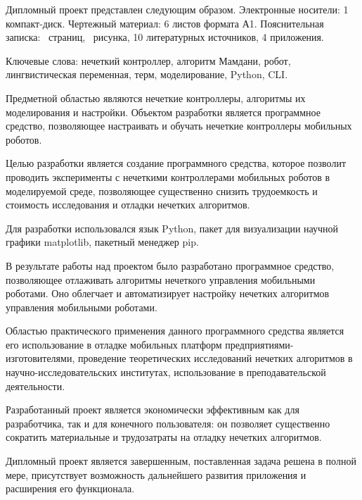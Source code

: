 \thispagestyle{empty}

Дипломный проект представлен следующим образом. Электронные
носители: 1 компакт-диск. Чертежный материал: 6 листов формата А1.
Пояснительная записка: \pageref*{LastPage}~страниц, \totfig{}~рисунка, 10 литературных
источников, 4 приложения.

Ключевые слова: нечеткий контроллер, алгоритм Мамдани, робот,
лингвистическая переменная, терм, моделирование, Python, CLI.

Предметной областью являются нечеткие контроллеры, алгоритмы их
моделирования и настройки. Объектом разработки является программное
средство, позволяющее настраивать и обучать нечеткие контроллеры
мобильных роботов.

Целью разработки является создание программного средства, которое
позволит проводить эксперименты с нечеткими контроллерами мобильных
роботов в моделируемой среде, позволяющее существенно снизить
трудоемкость и стоимость исследования и отладки нечетких алгоритмов.

Для разработки использовался язык Python, пакет для визуализации
научной графики matplotlib, пакетный менеджер pip.

В результате работы над проектом было разработано программное
средство, позволяющее отлаживать алгоритмы нечеткого управления
мобильными роботами. Оно облегчает и автоматизирует настройку нечетких
алгоритмов управления мобильными роботами.

Областью практического применения данного программного средства
является его использование в отладке мобильных платформ предприятиями-
изготовителями, проведение теоретических исследований нечетких
алгоритмов в научно-исследовательских институтах, использование в
преподавательской деятельности.

Разработанный проект является экономически эффективным как для
разработчика, так и для конечного пользователя: он позволяет существенно
сократить материальные и трудозатраты на отладку нечетких алгоритмов.

Дипломный проект является завершенным, поставленная задача
решена в полной мере, присутствует возможность дальнейшего развития
приложения и расширения его функционала. 
\clearpage
